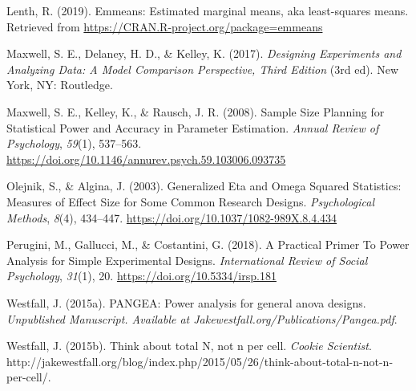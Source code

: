 \documentclass[
  english,
  ,jou,floatsintext]{apa6}
\begin{document}
\leavevmode\hypertarget{ref-lenthemmeans}{}%
Lenth, R. (2019). Emmeans: Estimated marginal means, aka least-squares means. Retrieved from \url{https://CRAN.R-project.org/package=emmeans}

\leavevmode\hypertarget{ref-maxwell_designing_2017}{}%
Maxwell, S. E., Delaney, H. D., \& Kelley, K. (2017). \emph{Designing Experiments and Analyzing Data: A Model Comparison Perspective, Third Edition} (3rd ed). New York, NY: Routledge.

\leavevmode\hypertarget{ref-maxwell_sample_2008}{}%
Maxwell, S. E., Kelley, K., \& Rausch, J. R. (2008). Sample Size Planning for Statistical Power and Accuracy in Parameter Estimation. \emph{Annual Review of Psychology}, \emph{59}(1), 537--563. \url{https://doi.org/10.1146/annurev.psych.59.103006.093735}

\leavevmode\hypertarget{ref-olejnik_generalized_2003}{}%
Olejnik, S., \& Algina, J. (2003). Generalized Eta and Omega Squared Statistics: Measures of Effect Size for Some Common Research Designs. \emph{Psychological Methods}, \emph{8}(4), 434--447. \url{https://doi.org/10.1037/1082-989X.8.4.434}

\leavevmode\hypertarget{ref-perugini_practical_2018}{}%
Perugini, M., Gallucci, M., \& Costantini, G. (2018). A Practical Primer To Power Analysis for Simple Experimental Designs. \emph{International Review of Social Psychology}, \emph{31}(1), 20. \url{https://doi.org/10.5334/irsp.181}

\leavevmode\hypertarget{ref-westfall2015pangea}{}%
Westfall, J. (2015a). PANGEA: Power analysis for general anova designs. \emph{Unpublished Manuscript. Available at Jakewestfall.org/Publications/Pangea.pdf}.

\leavevmode\hypertarget{ref-westfall_think_2015}{}%
Westfall, J. (2015b). Think about total N, not n per cell. \emph{Cookie Scientist}. http://jakewestfall.org/blog/index.php/2015/05/26/think-about-total-n-not-n-per-cell/.
\end{document}
